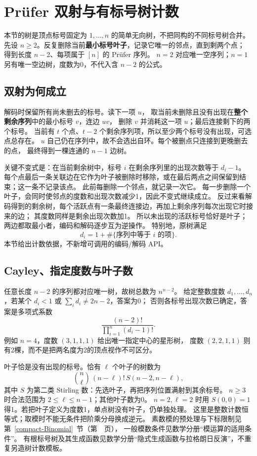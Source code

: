 \section{Prüfer 双射与有标号树计数}\label{knowledge-prufer}
本节的树是顶点标号固定为 $1,\ldots,n$ 的简单无向树，不把同构的不同标号树合并。
先设 $n\ge2$。反复删除当前\textbf{最小标号叶子}，记录它唯一的邻点，直到剩两个点；
得到长度 $n-2$、每项属于 $[n]$ 的 Prüfer 序列。
$n=2$ 对应唯一空序列；$n=1$ 另有唯一空边树，度数为0，不代入含 $n-2$ 的公式。

\subsection{双射为何成立}
解码时保留所有尚未删去的标号。读下一项 $u$，
取当前未删除且没有出现在\textbf{整个剩余序列}中的最小标号 $v$，连边 $uv$，
删除 $v$ 并消耗这一项 $u$；最后连接剩下的两个标号。
当前有 $t$ 个点、$t-2$ 个剩余序列项，所以至少两个标号没有出现，可选点总存在。
$u$ 自己仍在序列中，故不会选出自环。每个被删点只连接到更晚删去的点，
最终得到一棵连通的 $n-1$ 边树。

关键不变式是：在当前剩余树中，标号 $i$ 在剩余序列里的出现次数等于 $d_i-1$。
每个点最后一条关联边在它作为叶子被删除时移除，或在最后两点之间保留到结束；这一条不记录该点。
此前每删除一个邻点，就记录一次它。
每一步删除一个叶子，会同时使邻点的度数和出现次数减少1，因此不变式继续成立。
反过来看解码得到的剩余树，每个活跃点有一条最终连接边，再加上剩余序列每次出现它时接来的边；
其度数同样是剩余出现次数加1。
所以未出现的活跃标号恰好是叶子；两边都取最小者，编码和解码逐步互为逆操作。
特别地，原树满足
\[
 d_i=1+\#\{\text{序列中等于 }i\text{ 的项}\}.
\]
本节给出计数依据，不新增可调用的编码/解码 API。

\subsection{Cayley、指定度数与叶子数}
任意长度 $n-2$ 的序列都对应唯一树，故树总数为 $n^{n-2}$。
给定整数度数 $d_1,\ldots,d_n$，若某个 $d_i<1$ 或 $\sum_i d_i\ne2n-2$，答案为0；
否则各标号出现次数已确定，答案是多项式系数
\[
 \frac{(n-2)!}{\prod_{i=1}^n(d_i-1)!}.
\]
例如 $n=4$，度数 $(3,1,1,1)$ 给出唯一指定中心的星形树，
度数 $(2,2,1,1)$ 则有2棵，而不是把两名度为2的顶点视作不可区分。

叶子恰是没有出现的标号。恰有 $\ell$ 个叶子的树数为
\[
 \binom n\ell\,(n-\ell)!\,S(n-2,n-\ell),
\]
其中 $S$ 为第二类 Stirling 数：先选叶子，再把序列位置满射到其余标号。
$n\ge3$ 时合法范围为 $2\le\ell\le n-1$；其他叶子数为0。
$n=2,\ell=2$ 时用 $S(0,0)=1$ 得1。若把叶子定义为度数1，单点树没有叶子，仍单独处理。
这里是整数计数恒等式；取模时不能无条件把阶乘分母换成逆元。
素数模的预处理与下标限制见第~\ref{compact-Binomial}~节（第~\pageref{compact-Binomial}~页），
一般模数条件见数学分册“模运算的适用条件”。
有根标号树及其生成函数见数学分册“隐式生成函数与拉格朗日反演”，不重复另造树计数模板。

